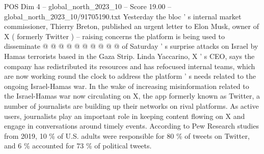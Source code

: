 \begin{textsample}{POS Dim 4 – global\_north\_2023\_10 – Score 19.00 – global\_north\_2023\_10/91705190.txt}
Yesterday the bloc ' s internal market commissioner, Thierry Breton, published an urgent letter to Elon Musk, owner of X ( formerly Twitter ) -- raising concerns the platform is being used to disseminate @ @ @ @ @ @ @ @ @ @ of Saturday ' s surprise attacks on Israel by Hamas terrorists based in the Gaza Strip.
Linda Yaccarino, X ' s CEO, says the company has redistributed its resources and has refocused internal teams, which are now working round the clock to address the platform ' s needs related to the ongoing Israel-Hamas war.
In the wake of increasing misinformation related to the Israel-Hamas war now circulating on X, the app formerly known as Twitter, a number of journalists are building up their networks on rival platforms.
As active users, journalists play an important role in keeping content flowing on X and engage in conversations around timely events.
According to Pew Research studies from 2019, 10 \% of U.S. adults were responsible for 80 \% of tweets on Twitter, and 6 \% accounted for 73 \% of political tweets.

\end{textsample}
